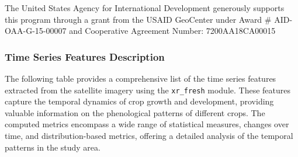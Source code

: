 \documentclass[
  journal,
  twocolumn]{IEEEtran}
\begin{document}
The United States Agency for International Development generously
supports this program through a grant from the USAID GeoCenter under
Award \# AID-OAA-G-15-00007 and Cooperative Agreement Number:
7200AA18CA00015

\hypertarget{time-series-features-description}{%
\subsubsection{Time Series Features
Description}\label{time-series-features-description}}

The following table provides a comprehensive list of the time series
features extracted from the satellite imagery using the
\texttt{xr\_fresh} module. These features capture the temporal dynamics
of crop growth and development, providing valuable information on the
phenological patterns of different crops. The computed metrics encompass
a wide range of statistical measures, changes over time, and
distribution-based metrics, offering a detailed analysis of the temporal
patterns in the study area.
\end{document}
